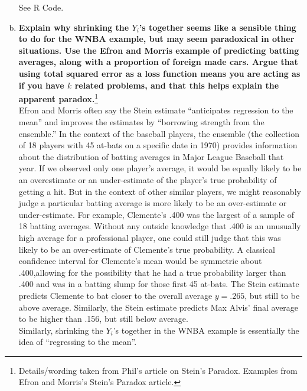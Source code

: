 \begin{enumerate}[a)]
    See R Code. \\
    
    \item \textbf{Explain why shrinking the $Y_i$'s together seems like a sensible thing to do for the WNBA example, but may seem paradoxical in other situations. Use the Efron and Morris example of predicting batting averages, along with a proportion of foreign made cars. 
    Argue that using total squared error as a loss function means you are acting as if you have $k$
    related problems, and that this helps explain the apparent paradox.}\footnote{Details/wording taken from Phil's article on Stein's Paradox. Examples from Efron and Morris's Stein's Paradox article.} \\

    Efron and Morris often say the Stein estimate ``anticipates regression to the
    mean'' and improves the estimates by ``borrowing strength from the ensemble.''
    In the context of the baseball players, the ensemble (the collection of 18 players with 45 at-bats on a specific date
    in 1970) provides information about the distribution of batting averages in
    Major League Baseball that year. If we observed only one player's average, it
    would be equally likely to be an overestimate or an under-estimate of the
    player's true probability of getting a hit. But in the context of other similar players, we might reasonably judge a particular batting average is more likely to be
    an over-estimate or under-estimate. For example, Clemente's .400 was the largest of a sample of 18 batting averages.
    Without any outside knowledge that .400 is an unusually high average for a
    professional player, one could still judge that this was likely to be an over-estimate
    of Clemente's true probability. A classical confidence interval for Clemente's
    mean would be symmetric about .400,allowing for the possibility that he had
    a true probability larger than .400 and was in a batting slump for those first
    45 at-bats. The Stein estimate predicts Clemente to bat closer to the overall
    average $y =.265$, but still to be above average. Similarly, the Stein estimate predicts Max Alvis' final average to be higher
    than .156, but still below average. \\

    Similarly, shrinking the $Y_i$'s together in the WNBA example is essentially the idea of ``regressing to the mean''. \\


\end{enumerate}
